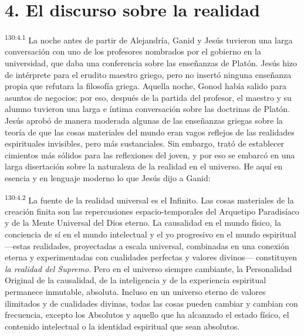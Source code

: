 \section*{4. El discurso sobre la realidad}
\par 
\textsuperscript{130:4.1} La noche antes de partir de Alejandría, Ganid y Jesús tuvieron una larga conversación con uno de los profesores nombrados por el gobierno en la universidad, que daba una conferencia sobre las enseñanzas de Platón. Jesús hizo de intérprete para el erudito maestro griego, pero no insertó ninguna enseñanza propia que refutara la filosofía griega. Aquella noche, Gonod había salido para asuntos de negocios; por eso, después de la partida del profesor, el maestro y su alumno tuvieron una larga e íntima conversación sobre las doctrinas de Platón. Jesús aprobó de manera moderada algunas de las enseñanzas griegas sobre la teoría de que las cosas materiales del mundo eran vagos reflejos de las realidades espirituales invisibles, pero más sustanciales. Sin embargo, trató de establecer cimientos más sólidos para las reflexiones del joven, y por eso se embarcó en una larga disertación sobre la naturaleza de la realidad en el universo. He aquí en esencia y en lenguaje moderno lo que Jesús dijo a Ganid:

\par 
\textsuperscript{130:4.2} La fuente de la realidad universal es el Infinito. Las cosas materiales de la creación finita son las repercusiones espacio-temporales del Arquetipo Paradisíaco y de la Mente Universal del Dios eterno. La causalidad en el mundo físico, la conciencia de sí en el mundo intelectual y el yo progresivo en el mundo espiritual ---estas realidades, proyectadas a escala universal, combinadas en una conexión eterna y experimentadas con cualidades perfectas y valores divinos--- constituyen \textit{la realidad del Supremo}. Pero en el universo siempre cambiante, la Personalidad Original de la causalidad, de la inteligencia y de la experiencia espiritual permanece inmutable, absoluta. Incluso en un universo eterno de valores ilimitados y de cualidades divinas, todas las cosas pueden cambiar y cambian con frecuencia, excepto los Absolutos y aquello que ha alcanzado el estado físico, el contenido intelectual o la identidad espiritual que sean absolutos.

